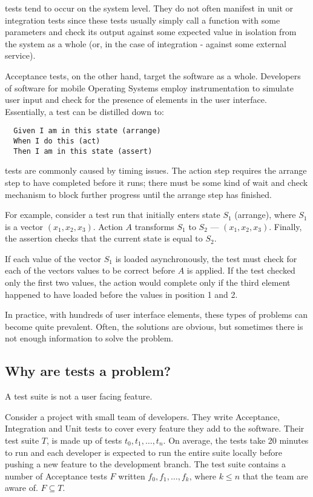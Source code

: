 \flaky{} tests tend to occur on the system level. They do not often manifest in unit or integration tests since these tests usually simply call a function with some parameters and check its output against some expected value in isolation from the system as a whole (or, in the case of integration - against some external service).

Acceptance tests, on the other hand, target the software as a whole. Developers of software for mobile Operating Systems employ instrumentation to simulate user input and check for the presence of elements in the user interface. Essentially, a test can be distilled down to:
\begin{verbatim}
  Given I am in this state (arrange)
  When I do this (act)
  Then I am in this state (assert)
\end{verbatim}

\flaky{} tests are commonly caused by timing issues. The action step requires the arrange step to have completed before it runs; there must be some kind of wait and check mechanism to block further progress until the arrange step has finished.

For example, consider a test run that initially enters state $S_{1}$ (arrange), where $S_{1}$ is a vector $(x_{1},x_{2},x_{3})$. Action $A$ transforms $S_1$ to $S_2$ --- $(x_{1},x_{2},x_{3})$. Finally, the assertion checks that the current state is equal to $S_2$.

If each value of the vector $S_{1}$ is loaded asynchronously, the test must check for each of the vectors values to be correct before $A$ is applied. If the test checked only the first two values, the action would complete only if the third element happened to have loaded before the values in position 1 and 2.

In practice, with hundreds of user interface elements, these types of problems can become quite prevalent. Often, the solutions are obvious, but sometimes there is not enough information to solve the problem.

\subsection{Why are \flaky{} tests a problem?}

A test suite is not a user facing feature.

Consider a project with small team of developers. They write Acceptance, Integration and Unit tests to cover every feature they add to the software. Their test suite $T$, is made up of tests $t_{0}, t_{1}, \dots, t_{n}$. On average, the tests take 20 minutes to run and each developer is expected to run the entire suite locally before pushing a new feature to the development branch. The test suite contains a number of \flaky{} Acceptance tests $F$ written $f_{0}, f_{1}, \dots, f_{k} \text{, where $k \leq n$}$ that the team are aware of. $F \subseteq T$.

